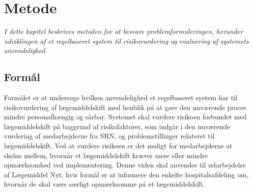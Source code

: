 \chapter{Metode}
\textit{I dette kapitel beskrives metoden for at besvare problemformuleringen, herunder udviklingen af et regelbaseret system til risikovurdering og evaluering af systemets anvendelighed.}

\section{Formål}
Formålet er at undersøge hvilken anvendelighed et regelbaseret system har til risikovurdering af lægemiddelskift med henblik på at gøre den nuværende proces mindre personafhængig og sårbar. Systemet skal vurdere risikoen forbundet med lægemiddelskift på baggrund af risikofaktorer, som indgår i den nuværende vurdering af medarbejderne fra SRN, og problemstillinger relateret til lægemiddelskift. Ved at vurdere risikoen er det muligt for medarbejderne at skelne mellem, hvornår et lægemiddelskift kræver mere eller mindre opmærksomhed ved implementering. Denne viden skal anvendes til udarbejdelse af Lægemiddel Nyt, hvis formål er at informere den enkelte hospitalsafdeling om, hvornår de skal være særligt opmærksomme på et lægemiddelskift.





